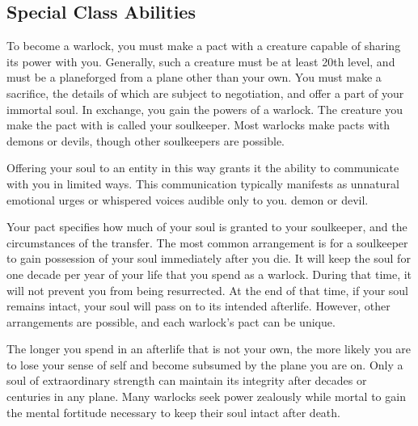     \subsection{Special Class Abilities}

        To become a warlock, you must make a pact with a creature capable of sharing its power with you.
        Generally, such a creature must be at least 20th level, and must be a planeforged from a plane other than your own.
        You must make a sacrifice, the details of which are subject to negotiation, and offer a part of your immortal soul.
        In exchange, you gain the powers of a warlock.
        The creature you make the pact with is called your soulkeeper.
        Most warlocks make pacts with demons or devils, though other soulkeepers are possible.

        Offering your soul to an entity in this way grants it the ability to communicate with you in limited ways.
        This communication typically manifests as unnatural emotional urges or whispered voices audible only to you.
        demon or devil.

        Your pact specifies how much of your soul is granted to your soulkeeper, and the circumstances of the transfer.
        The most common arrangement is for a soulkeeper to gain possession of your soul immediately after you die.
        It will keep the soul for one decade per year of your life that you spend as a warlock.
        During that time, it will not prevent you from being resurrected.
        At the end of that time, if your soul remains intact, your soul will pass on to its intended afterlife.
        However, other arrangements are possible, and each warlock's pact can be unique.

        The longer you spend in an afterlife that is not your own, the more likely you are to lose your sense of self and become subsumed by the plane you are on.
        Only a soul of extraordinary strength can maintain its integrity after decades or centuries in any plane.
        Many warlocks seek power zealously while mortal to gain the mental fortitude necessary to keep their soul intact after death.

